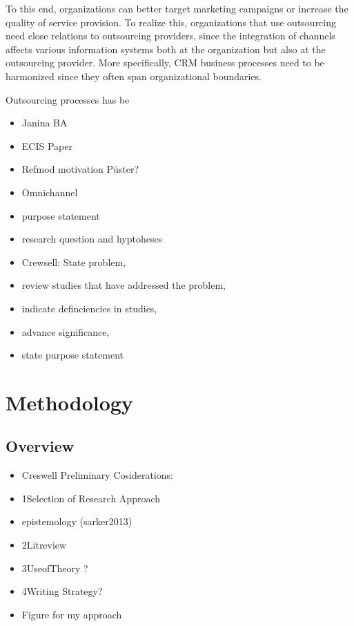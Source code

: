 To this end, organizations can better target marketing campaigns or increase the quality of service provision. To realize this, organizations that use outsourcing need close relations to outsourcing providers, since the integration of channels affects various information systems both at the organization but also at the outsourcing provider. More specifically, CRM business processes need to be harmonized since they often span organizational boundaries.


 

Outsourcing processes has be


	\begin{itemize}
		\item Janina BA
		\item ECIS Paper
		\item Refmod motivation Püster?
		\item Omnichannel 
		\item purpose statement
		\item research question and hyptoheses
	\end{itemize}

	\begin{itemize}
		\item Crewsell: State problem, 
		\item review studies that have addressed the problem,
		\item  indicate definciencies in studies, 
		\item advance significance, 
		\item state purpose statement
	\end{itemize}
\chapter{Methodology}
	\section{Overview}
		\begin{itemize}
			\item Creswell Preliminary Cosiderations:
			\item 1Selection of Research Approach
			\item epistemology (sarker2013)
			\item 2Litreview
			\item 3UseofTheory ?
			\item 4Writing Strategy?
			\item Figure for my approach
		\end{itemize}
	
